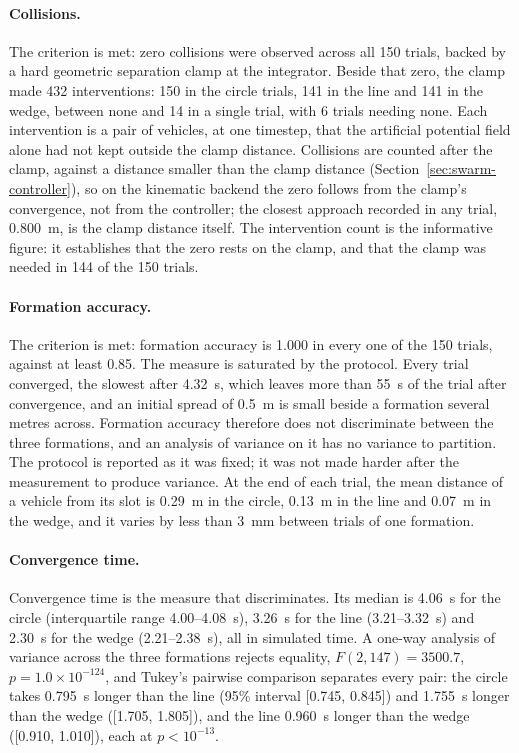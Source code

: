 \paragraph{Collisions.} The criterion is met: zero collisions were observed across all 150 trials,
backed by a hard geometric separation clamp at the integrator. Beside that zero, the clamp made
432 interventions: 150 in the circle trials, 141 in the line and 141 in the wedge, between none and
14 in a single trial, with 6 trials needing none. Each intervention is a pair of vehicles, at one
timestep, that the artificial potential field alone had not kept outside the clamp distance.
Collisions are counted after the clamp, against a distance smaller than the clamp distance
(Section~\ref{sec:swarm-controller}), so on the kinematic backend the zero follows from the
clamp's convergence, not from the controller; the closest approach recorded in any trial,
0.800~m, is the clamp distance itself. The intervention count is the informative figure: it
establishes that the zero rests on the clamp, and that the clamp was needed in 144 of the 150 trials.

\paragraph{Formation accuracy.} The criterion is met: formation accuracy is 1.000 in every one of
the 150 trials, against at least 0.85. The measure is saturated by the protocol. Every trial
converged, the slowest after 4.32~s, which leaves more than 55~s of the trial after convergence,
and an initial spread of 0.5~m is small beside a formation several metres across.
Formation accuracy therefore does not discriminate between the three formations, and an analysis
of variance on it has no variance to partition. The protocol is reported as it was fixed; it was
not made harder after the measurement to produce variance. At the end of each trial, the mean
distance of a vehicle from its slot is 0.29~m in the circle, 0.13~m in the line and 0.07~m in the
wedge, and it varies by less than 3~mm between trials of one formation.

\paragraph{Convergence time.} Convergence time is the measure that discriminates. Its median is
4.06~s for the circle (interquartile range 4.00--4.08~s), 3.26~s for the line (3.21--3.32~s) and
2.30~s for the wedge (2.21--2.38~s), all in simulated time. A one-way analysis of variance across
the three formations rejects equality, $F(2, 147) = 3500.7$, $p = 1.0 \times 10^{-124}$, and
Tukey's pairwise comparison separates every pair: the circle takes 0.795~s longer than the line
(95\% interval [0.745, 0.845]) and 1.755~s longer than the wedge ([1.705, 1.805]), and the line
0.960~s longer than the wedge ([0.910, 1.010]), each at $p < 10^{-13}$.

